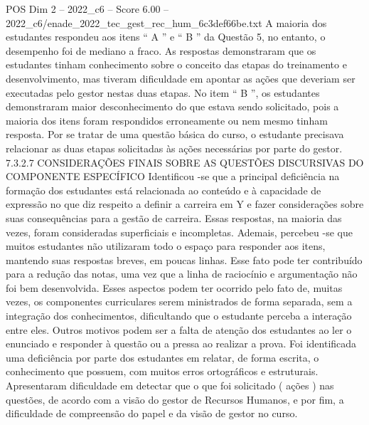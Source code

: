 \begin{textsample}{POS Dim 2 – 2022\_c6 – Score 6.00 – 2022\_c6/enade\_2022\_tec\_gest\_rec\_hum\_6c3def66be.txt}
A maioria dos estudantes respondeu aos itens “ A ” e “ B ” da Questão 5, no entanto, o desempenho foi de mediano a fraco.
As respostas demonstraram que os estudantes tinham conhecimento sobre o conceito das etapas do treinamento e desenvolvimento, mas tiveram dificuldade em apontar as ações que deveriam ser executadas pelo gestor nestas duas etapas.
No item “ B ”, os estudantes demonstraram maior desconhecimento do que estava sendo solicitado, pois a maioria dos itens foram respondidos erroneamente ou nem mesmo tinham resposta.
Por se tratar de uma questão básica do curso, o estudante precisava relacionar as duas etapas solicitadas às ações necessárias por parte do gestor. 7.3.2.7 CONSIDERAÇÕES FINAIS SOBRE AS QUESTÕES DISCURSIVAS DO COMPONENTE ESPECÍFICO Identificou -se que a principal deficiência na formação dos estudantes está relacionada ao conteúdo e à capacidade de expressão no que diz respeito a definir a carreira em Y e fazer considerações sobre suas consequências para a gestão de carreira.
Essas respostas, na maioria das vezes, foram consideradas superficiais e incompletas.
Ademais, percebeu -se que muitos estudantes não utilizaram todo o espaço para responder aos itens, mantendo suas respostas breves, em poucas linhas.
Esse fato pode ter contribuído para a redução das notas, uma vez que a linha de raciocínio e argumentação não foi bem desenvolvida.
Esses aspectos podem ter ocorrido pelo fato de, muitas vezes, os componentes curriculares serem ministrados de forma separada, sem a integração dos conhecimentos, dificultando que o estudante perceba a interação entre eles.
Outros motivos podem ser a falta de atenção dos estudantes ao ler o enunciado e responder à questão ou a pressa ao realizar a prova.
Foi identificada uma deficiência por parte dos estudantes em relatar, de forma escrita, o conhecimento que possuem, com muitos erros ortográficos e estruturais.
Apresentaram dificuldade em detectar que o que foi solicitado ( ações ) nas questões, de acordo com a visão do gestor de Recursos Humanos, e por fim, a dificuldade de compreensão do papel e da visão de gestor no curso.

\end{textsample}
